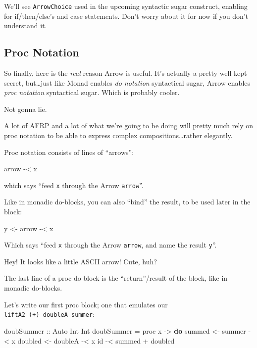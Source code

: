 \documentclass[]{article}
\newenvironment{Shaded}{}{}
\newcommand{\DataTypeTok}[1]{\textcolor[rgb]{0.56,0.13,0.00}{#1}}
\newcommand{\FunctionTok}[1]{\textcolor[rgb]{0.02,0.16,0.49}{#1}}
\newcommand{\KeywordTok}[1]{\textcolor[rgb]{0.00,0.44,0.13}{\textbf{#1}}}
\newcommand{\NormalTok}[1]{#1}
\newcommand{\OperatorTok}[1]{\textcolor[rgb]{0.40,0.40,0.40}{#1}}
\newcommand{\OtherTok}[1]{\textcolor[rgb]{0.00,0.44,0.13}{#1}}
\begin{document}
We'll see \texttt{ArrowChoice} used in the upcoming syntactic sugar construct,
enabling for if/then/else's and case statements. Don't worry about it for now if
you don't understand it.

\hypertarget{proc-notation}{%
\subsection{Proc Notation}\label{proc-notation}}

So finally, here is the \emph{real} reason Arrow is useful. It's actually a
pretty well-kept secret, but\ldots just like Monad enables \emph{do notation}
syntactical sugar, Arrow enables \emph{proc notation} syntactical sugar. Which
is probably cooler.

Not gonna lie.

A lot of AFRP and a lot of what we're going to be doing will pretty much rely on
proc notation to be able to express complex compositions\ldots rather elegantly.

Proc notation consists of lines of ``arrows'':

\begin{Shaded}
\begin{Highlighting}[]
\NormalTok{arrow }\OperatorTok{{-}<}\NormalTok{ x}
\end{Highlighting}
\end{Shaded}

which says ``feed \texttt{x} through the Arrow \texttt{arrow}''.

Like in monadic do-blocks, you can also ``bind'' the result, to be used later in
the block:

\begin{Shaded}
\begin{Highlighting}[]
\NormalTok{y }\OtherTok{<{-}}\NormalTok{ arrow }\OperatorTok{{-}<}\NormalTok{ x}
\end{Highlighting}
\end{Shaded}

Which says ``feed \texttt{x} through the Arrow \texttt{arrow}, and name the
result \texttt{y}''.

Hey! It looks like a little ASCII arrow! Cute, huh?

The last line of a proc do block is the ``return''/result of the block, like in
monadic do-blocks.

Let's write our first proc block; one that emulates our
\texttt{liftA2\ (+)\ doubleA\ summer}:

\begin{Shaded}
\begin{Highlighting}[]
\OtherTok{doubSummer ::} \DataTypeTok{Auto} \DataTypeTok{Int} \DataTypeTok{Int}
\NormalTok{doubSummer }\OtherTok{=}\NormalTok{ proc x }\OtherTok{{-}>} \KeywordTok{do}
\NormalTok{    summed  }\OtherTok{<{-}}\NormalTok{ summer  }\OperatorTok{{-}<}\NormalTok{ x}
\NormalTok{    doubled }\OtherTok{<{-}}\NormalTok{ doubleA }\OperatorTok{{-}<}\NormalTok{ x}
    \FunctionTok{id} \OperatorTok{{-}<}\NormalTok{ summed }\OperatorTok{+}\NormalTok{ doubled}
\end{Highlighting}
\end{Shaded}
\end{document}
